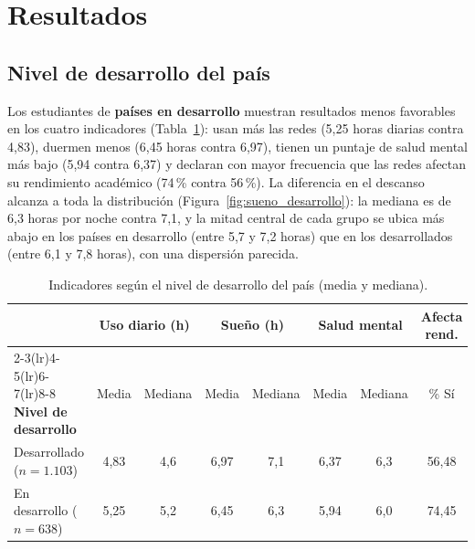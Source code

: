 \section{Resultados}

\subsection{Nivel de desarrollo del país}

Los estudiantes de \textbf{países en desarrollo} muestran resultados menos favorables en los cuatro
indicadores (Tabla~\ref{tab:desarrollo}): usan más las redes (5,25 horas diarias contra 4,83), duermen
menos (6,45 horas contra 6,97), tienen un puntaje de salud mental más bajo (5,94 contra 6,37) y declaran con
mayor frecuencia que las redes afectan su rendimiento académico (74\,\% contra 56\,\%). La diferencia en el
descanso alcanza a toda la distribución (Figura~\ref{fig:sueno_desarrollo}): la mediana es de 6,3 horas
por noche contra 7,1, y la mitad central de cada grupo se ubica más abajo en los países en desarrollo
(entre 5,7 y 7,2 horas) que en los desarrollados (entre 6,1 y 7,8 horas), con una dispersión parecida.

\begin{table}[H]
\centering
\small
\caption{Indicadores según el nivel de desarrollo del país (media y mediana).}
\label{tab:desarrollo}
\begin{tabular}{l cc cc cc c}
\toprule
& \multicolumn{2}{c}{\textbf{Uso diario (h)}} & \multicolumn{2}{c}{\textbf{Sueño (h)}}
& \multicolumn{2}{c}{\textbf{Salud mental}} & \textbf{Afecta rend.} \\
\cmidrule(lr){2-3}\cmidrule(lr){4-5}\cmidrule(lr){6-7}\cmidrule(lr){8-8}
\textbf{Nivel de desarrollo} & Media & Mediana & Media & Mediana & Media & Mediana & \% Sí \\
\midrule
Desarrollado ($n=1.103$)  & 4,83 & 4,6 & 6,97 & 7,1 & 6,37 & 6,3 & 56,48 \\
En desarrollo ($n=638$)   & 5,25 & 5,2 & 6,45 & 6,3 & 5,94 & 6,0 & 74,45 \\
\bottomrule
\end{tabular}
\end{table}

